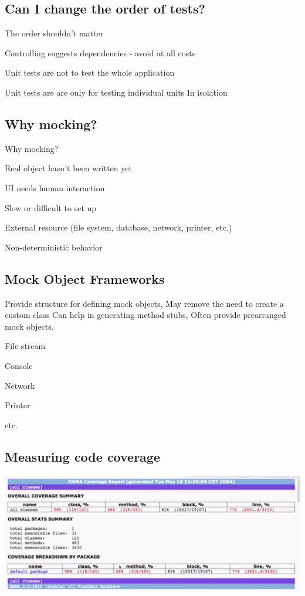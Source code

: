 \documentclass[a4paper,14pt, twocolumn]{extarticle}
\begin{document}
		\subsection{Can I change the order of tests?}
			\begin{compactitem}
				\item  The order shouldn’t matter 
				\item Controlling suggests dependencies - avoid at all costs 
				\item Unit tests are not to test the whole application 
				\item Unit tests are are only for testing individual units 
				\subitem In isolation
			\end{compactitem}
		\newpage
		\subsection{Why mocking?}
			\begin{compactitem}
				\item Why mocking?
				\item Real object hasn’t been written yet 
				\item UI needs human interaction 
				\item Slow or difficult to set up 
				\item External resource (file system, database, network, printer, etc.) 
				\item Non-deterministic behavior
			\end{compactitem}
		\subsection{Mock Object Frameworks}
			Provide structure for defining mock objects, May remove the need to create a custom class
			Can help in generating method stubs, 
			Often provide prearranged mock objects.
			\begin{compactitem}
				\item File stream 
				\item Console 
				\item Network 
				\item Printer 
				\item etc.
			\end{compactitem}
		\onecolumn
		\subsection{Measuring code coverage}
			\begin{center}
				\includegraphics[width=18cm]{cc}
			\end{center}
\end{document}
